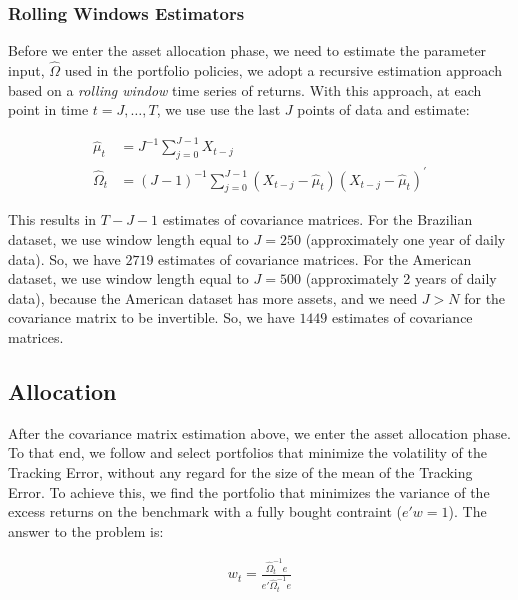 \documentclass[12pt,oneside,a4paper]{memoir}
\begin{document}
\subsubsection*{Rolling Windows Estimators}
Before we enter the asset allocation phase, we need to estimate the parameter input, $\hat{\Omega}$ used in the portfolio policies, we adopt a recursive estimation approach based on a \textit{rolling window} time series of returns.
With this approach, at each point in time $t=J, \dots, T$, we use use the last $J$ points of data and estimate:

\vspace{-18 pt}
\begin{align*}
	\hat{\mu}_{t} &=
	J^{-1} \sum^{J-1}_{j=0} X_{t-j}
	\\
	\hat{\Omega}_{t} &=
	(J-1)^{-1} \sum^{J-1}_{j=0}
	(X_{t-j} - \hat{\mu}_{t})(X_{t-j} - \hat{\mu}_{t})^{\prime}
\end{align*}

This results in $T-J-1$ estimates of covariance matrices.
For the Brazilian dataset, we use window length equal to $J=250$ (approximately one year of daily data).
So, we have $2719$ estimates of covariance matrices.
% 
For the American dataset, we use window length equal to $J=500$ (approximately 2 years of daily data), because the American dataset has more assets, and we need $J>N$ for the covariance matrix to be invertible.
So, we have $1449$ estimates of covariance matrices.

\subsection*{Allocation}
After the covariance matrix estimation above, we enter the asset allocation phase.
To that end, we follow  and select portfolios that minimize the volatility of the Tracking Error, without any regard for the size of the mean of the Tracking Error.
To achieve this, we find the portfolio that minimizes the variance of the excess returns on the benchmark with a fully bought contraint ($e'w=1$).
The answer to the problem is:


\vspace{-18 pt}
\begin{align} \label{eq:gmv}
w_{t} = \frac{\hat{\Omega}_{t}^{-1}e}{e'\hat{\Omega}_{t}^{-1}e}
\end{align}
\end{document}
